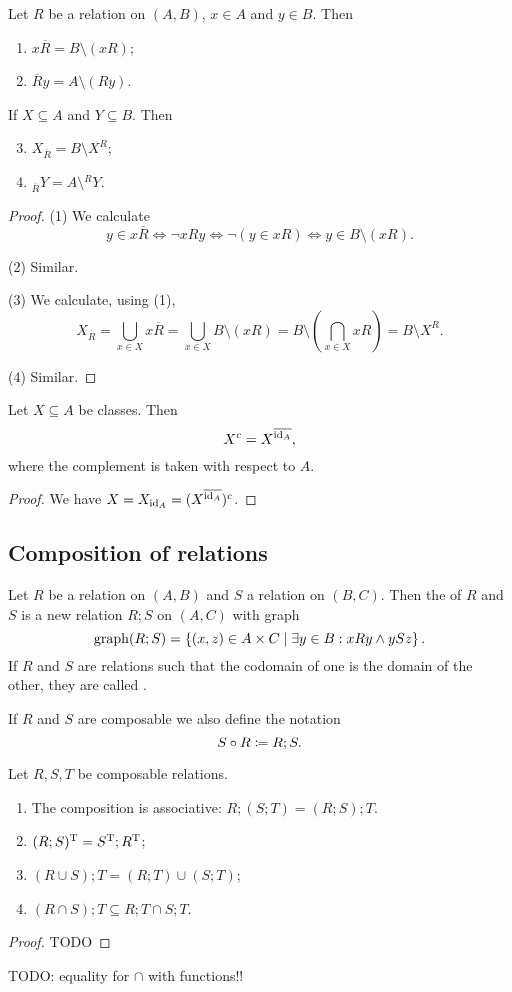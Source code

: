 \begin{lemma}
Let $R$ be a relation on $(A,B)$, $x\in A$ and $y\in B$. Then
\begin{enumerate}
\item $x\overline{R} = B\setminus (xR)$;
\item $\overline{R}y = A\setminus (Ry)$.
\end{enumerate}
If $X\subseteq A$ and $Y\subseteq B$. Then
\begin{enumerate} \setcounter{enumi}{2}
\item $X_{\overline{R}} = B\setminus X^R$;
\item $_{\overline{R}}Y = A\setminus {^RY}$.
\end{enumerate}
\end{lemma}
\begin{proof}
(1) We calculate
\[ y \in x\overline{R} \iff \neg xRy \iff \neg (y\in xR) \iff y\in B\setminus (xR). \]

(2) Similar.

(3) We calculate, using (1),
\[ X_{\overline{R}} = \bigcup_{x\in X}x\overline{R} = \bigcup_{x\in X}B\setminus (xR) = B\setminus \left(\bigcap_{x\in X}xR\right) = B\setminus X^R. \]

(4) Similar.
\end{proof}
\begin{corollary}
Let $X\subseteq A$ be classes. Then
\[ X^c = X^{\overline{\operatorname{id}_A}}, \]
where the complement is taken with respect to $A$.
\end{corollary}
\begin{proof}
We have $X = X_{\operatorname{id}_A} = (X^{\overline{\operatorname{id}_A}})^c$.
\end{proof}

\subsection{Composition of relations}
\begin{definition}
Let $R$ be a relation on $(A, B)$ and $S$ a relation on $(B, C)$. Then the  of $R$ and $S$ is a new relation $R;S$ on $(A, C)$ with graph
\[ \operatorname{graph}(R;S) = \left\{ (x,z)\in A\times C \;\middle|\; \exists y\in B: xRy \land ySz \right\}. \]
If $R$ and $S$ are relations such that the codomain of one is the domain of the other, they are called .

If $R$ and $S$ are composable we also define the notation
\[ S\circ R \coloneqq R;S. \]
\end{definition}
\begin{lemma} \label{relationalComposition}
Let $R,S,T$ be composable relations.
\begin{enumerate}
\item The composition is associative: $R;(S;T) = (R;S);T$.
\item $(R;S)^{\mathrm{T}} = S^{\mathrm{T}} ; R^{\mathrm{T}}$;
\item $(R\cup S);T = (R;T) \cup (S;T)$;
\item $(R\cap S);T \subseteq R;T \cap S;T$.
\end{enumerate}
\end{lemma}
\begin{proof}
TODO
\end{proof}
TODO: equality for $\cap$ with functions!!

